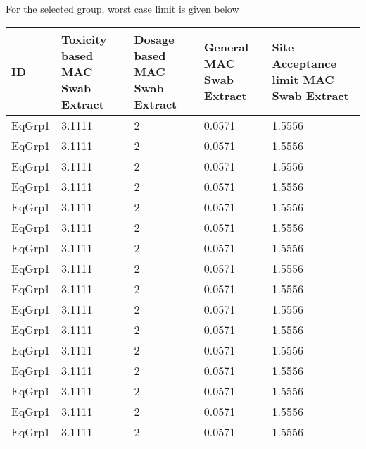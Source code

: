 \documentclass{article}
\begin{document}
        For the selected group, worst case limit is given below
        \begin{longtable}[l]{|p{1.5cm} |p{3cm} |p{3cm} |p{3cm} |p{3cm} |} \hline
        
            ID&Toxicity based MAC Swab Extract&Dosage based MAC Swab Extract&General MAC Swab Extract &Site Acceptance limit MAC Swab Extract\\\hline
        
            EqGrp1&3.1111&2&0.0571&1.5556\\\hline
        
            EqGrp1&3.1111&2&0.0571&1.5556\\\hline
        
            EqGrp1&3.1111&2&0.0571&1.5556\\\hline
        
            EqGrp1&3.1111&2&0.0571&1.5556\\\hline
        
            EqGrp1&3.1111&2&0.0571&1.5556\\\hline
        
            EqGrp1&3.1111&2&0.0571&1.5556\\\hline
        
            EqGrp1&3.1111&2&0.0571&1.5556\\\hline
        
            EqGrp1&3.1111&2&0.0571&1.5556\\\hline
        
            EqGrp1&3.1111&2&0.0571&1.5556\\\hline
        
            EqGrp1&3.1111&2&0.0571&1.5556\\\hline
        
            EqGrp1&3.1111&2&0.0571&1.5556\\\hline
        
            EqGrp1&3.1111&2&0.0571&1.5556\\\hline
        
            EqGrp1&3.1111&2&0.0571&1.5556\\\hline
        
            EqGrp1&3.1111&2&0.0571&1.5556\\\hline
        
            EqGrp1&3.1111&2&0.0571&1.5556\\\hline
        
            EqGrp1&3.1111&2&0.0571&1.5556\\\hline
        

\end{longtable}
\end{document}
